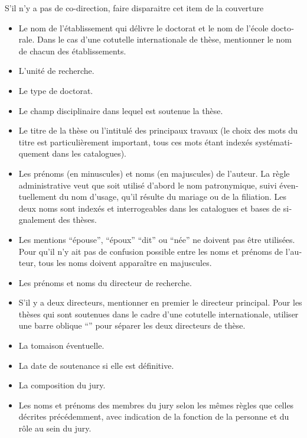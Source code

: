 \begin{otherlanguage}{french}
S’il n’y a pas de co-direction, faire disparaitre cet item de la couverture


\begin{itemize}
	\item Le nom de l'établissement qui délivre le doctorat et le nom de l’école doctorale.
	Dans le cas d’une cotutelle internationale de thèse, mentionner le nom de chacun des
	établissements.
	\item  L'unité de recherche.
	\item Le type de doctorat.
	\item Le champ disciplinaire dans lequel est soutenue la thèse.
	\item Le titre de la thèse ou l’intitulé des principaux travaux (le choix des mots du titre est	particulièrement important, tous ces mots étant indexés systématiquement dans les catalogues).
	\item Les prénoms (en minuscules) et noms (en majuscules) de l'auteur.
	La règle administrative veut que soit utilisé d'abord le nom patronymique, suivi éventuellement du 	nom d’usage, qu’il résulte du mariage ou de la filiation. Les deux noms sont indexés et interrogeables dans les catalogues et bases de signalement des thèses.
	\item Les mentions \enquote{épouse}, \enquote{époux} \enquote{dit}  ou \enquote{née} ne doivent pas être utilisées. Pour qu'il n'y 	ait pas de confusion possible entre les noms et prénoms de l'auteur, tous les noms doivent apparaître en majuscules.
	\item Les prénoms et noms du directeur de recherche.
	\item S'il y a deux directeurs, mentionner en premier le directeur principal. Pour les thèses qui sont soutenues dans le cadre d'une cotutelle internationale, utiliser une barre oblique \enquote{\/} pour séparer les deux directeurs de thèse.
	\item La tomaison éventuelle.
	\item La date de soutenance si elle est définitive.
	\item La composition du jury.
	\item Les noms et prénoms des membres du jury selon les mêmes règles que celles décrites
précédemment, avec indication de la fonction de la personne et du rôle au sein du jury. 
\end{itemize}


\end{otherlanguage}
